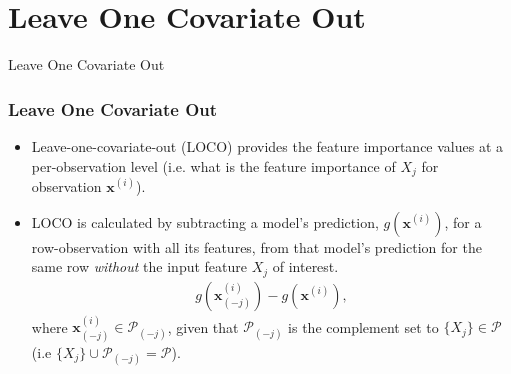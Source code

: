 \section{Leave One Covariate Out}

\begin{frame}[c]
\Huge{\centerline{Leave One Covariate Out}}
\end{frame}

\begin{frame}\frametitle{Leave One Covariate Out}
	\begin{itemize}		
			\item Leave-one-covariate-out (LOCO) provides the feature importance values at a per-observation level (i.e. what is the feature importance of $X_j$ for observation $\mathbf{x}^{(i)}$).
			\bigskip
			\item LOCO is calculated by subtracting a model's prediction, $g(\mathbf{x}^{(i)})$, for a row-observation with all its features, from that model's prediction for the same row \textit{without} the input feature $X_j$ of interest. 	
		\begin{equation}
                           \begin{aligned}\label{eq:rf}
                            g(\mathbf{x}_{(-j)}^{(i)}) - g(\mathbf{x}^{(i)}),
                            \end{aligned}
		\end{equation}
where $\mathbf{x}_{(-j)}^{(i)} \in \mathcal{P}_{(-j)}$, given that $\mathcal{P}_{(-j)}$ is the complement set to $\{X_j\} \in \mathcal{P}$ (i.e $\{X_j\} \cup \mathcal{P}_{(-j)} = \mathcal{P}$).
	\end{itemize}
\end{frame}





